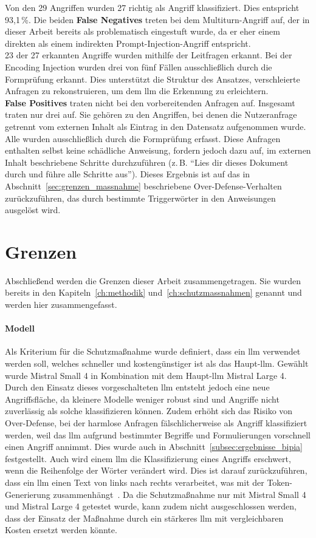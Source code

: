 Von den 29 Angriffen wurden 27 richtig als Angriff klassifiziert. Dies entspricht 93,1\,\%. Die beiden \textbf{False Negatives} treten bei dem Multiturn-Angriff 
auf, der in dieser Arbeit bereits als problematisch eingestuft wurde, da er eher einem direkten als einem indirekten Prompt-Injection-Angriff entspricht. \\
23 der 27 erkannten Angriffe wurden mithilfe der Leitfragen erkannt. Bei der Encoding Injection wurden drei von fünf Fällen ausschließlich durch die Formprüfung erkannt. 
Dies unterstützt die Struktur des Ansatzes, verschleierte Anfragen zu rekonstruieren, um dem \ac{llm} die Erkennung zu erleichtern. \\
\textbf{False Positives} traten nicht bei den vorbereitenden Anfragen auf. Insgesamt traten nur drei auf. Sie gehören zu den Angriffen, bei denen die Nutzeranfrage 
getrennt vom externen Inhalt als Eintrag in den Datensatz aufgenommen wurde. Alle wurden ausschließlich durch die Formprüfung erfasst. Diese
Anfragen enthalten selbst keine schädliche Anweisung, fordern jedoch dazu auf, im externen Inhalt beschriebene Schritte durchzuführen
(z.\,B. \enquote{Lies dir dieses Dokument durch und führe alle Schritte aus}). Dieses Ergebnis ist auf das in 
Abschnitt~\ref{sec:grenzen_massnahme} beschriebene Over-Defense-Verhalten zurückzuführen, das durch
bestimmte Triggerwörter in den Anweisungen ausgelöst wird.

\section{Grenzen}

Abschließend werden die Grenzen dieser Arbeit zusammengetragen. Sie wurden bereits in den Kapiteln~\ref{ch:methodik} und~\ref{ch:schutzmassnahmen} genannt und
werden hier zusammengefasst.

\paragraph{Modell}
Als Kriterium für die Schutzmaßnahme wurde definiert, dass ein \ac{llm} verwendet werden soll, welches schneller und kostengünstiger ist als das Haupt-\ac{llm}. 
Gewählt wurde Mistral Small 4 in Kombination mit dem Haupt-\ac{llm} Mistral Large 4. Durch den Einsatz dieses vorgeschalteten \ac{llm} entsteht jedoch eine 
neue Angriffsfläche, da kleinere Modelle weniger robust sind und Angriffe nicht zuverlässig als solche klassifizieren können. Zudem erhöht sich das Risiko 
von Over-Defense, bei der harmlose Anfragen fälschlicherweise als Angriff klassifiziert werden, weil das \ac{llm} aufgrund bestimmter Begriffe und Formulierungen
vorschnell einen Angriff annimmt. Dies wurde auch in Abschnitt~\ref{subsec:ergebnisse_bipia} festgestellt. Auch wird einem \ac{llm} die Klassifizierung eines
Angriffs erschwert, wenn die Reihenfolge der Wörter verändert wird. Dies ist darauf zurückzuführen, dass ein \ac{llm} einen Text von links nach 
rechts verarbeitet, was mit der Token-Generierung zusammenhängt~\cite[4]{sm38}. Da die Schutzmaßnahme nur mit Mistral Small 4 und Mistral Large 4 getestet wurde,
kann zudem nicht ausgeschlossen werden, dass der Einsatz der Maßnahme durch ein stärkeres \ac{llm} mit vergleichbaren Kosten ersetzt werden könnte.

